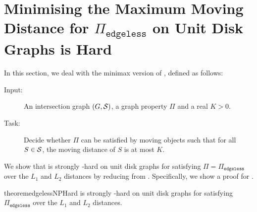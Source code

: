 \section{Minimising the Maximum Moving Distance for \texorpdfstring{$\Pi_{\texttt{edgeless}}$}{} on Unit Disk Graphs is Hard}\label{sec:disk_edgeless}

    \newcommand{\bdisk}[1]{B\langle #1\rangle }
    \newcommand{\ldisk}[1]{L\langle #1\rangle }
    \newcommand{\hdisk}[1]{H\langle #1\rangle }
    \newcommand{\cstate}{\D_\Phi}
    \newcommand{\istate}{\D^{(i)}_\Phi}
    \newcommand{\mstate}{\D^{(m)}_\Phi}
    \newcommand{\mstatefinal}[1]{(#1)^{(\mathit{moved})}}
    \newcommand{\ismoved}[1]{\X(#1)}
    \newcommand{\movedpos}[1]{\X_{\mathit{pos}}(#1)}
%
%
In this section, we deal with the minimax version of {\gged}, defined as follows:
%
\begin{itembox}[l]{{\ggedmm}}\label{pro:edg_disk}
    \begin{description}%
        \item[Input:] An intersection graph $(G,\S)$, a graph property $\Pi$ and a real $K>0$.
        \item[Task:] Decide whether $\Pi$ can be satisfied by moving objects such that for all $S\in \S$, the moving distance of $S$ is at most $K$.
    \end{description}
\end{itembox}

We show that {\ggedmm} is strongly {\NP-hard} on unit disk graphs for satisfying $\Pi = \Pi_{\texttt{edgeless}}$ over the $L_1$ and $L_2$ distances by reducing from {\pthreesat}.
Specifically, we show a proof for .

\begin{restatable}{theorem}{edgelessNPHard}\label{thm:edgeless_np_hard}
    {\ggedmm} is strongly {\NP-hard} on unit disk graphs for satisfying $\Pi_{\texttt{edgeless}}$ over the $L_1$ and $L_2$ distances.
\end{restatable}

